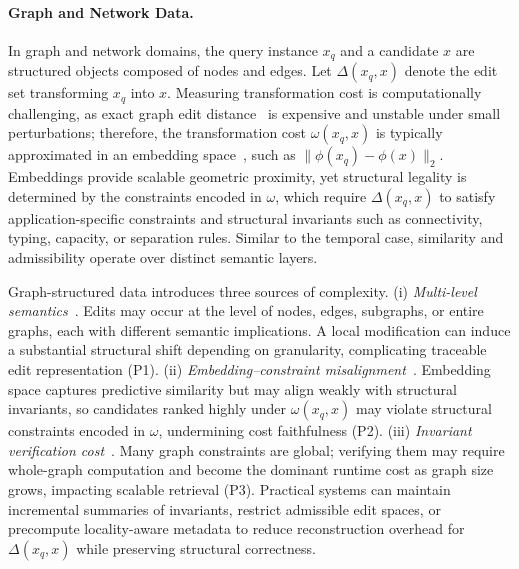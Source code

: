 \paragraph{Graph and Network Data.}

In graph and network domains, the query instance $x_q$ and a candidate $x$ are structured objects composed of nodes and edges. Let $\Delta(x_q,x)$ denote the edit set transforming $x_q$ into $x$. Measuring transformation cost is computationally challenging, as exact graph edit distance~\cite{gao2010survey} is expensive and unstable under small perturbations; therefore, the transformation cost $\omega(x_q,x)$ is typically approximated in an embedding space~\cite{kipf2016semi}, such as $\|\phi(x_q)-\phi(x)\|_2$. Embeddings provide scalable geometric proximity, yet structural legality is determined by the constraints encoded in $\omega$, which require $\Delta(x_q,x)$ to satisfy application-specific constraints and structural invariants such as connectivity, typing, capacity, or separation rules. Similar to the temporal case, similarity and admissibility operate over distinct semantic layers.

Graph-structured data introduces three sources of complexity. (i) \emph{Multi-level semantics}~\cite{liang2021mile}. Edits may occur at the level of nodes, edges, subgraphs, or entire graphs, each with different semantic implications. A local modification can induce a substantial structural shift depending on granularity, complicating traceable edit representation (P1). (ii) \emph{Embedding–constraint misalignment}~\cite{armgaan2024graphtrail}. Embedding space captures predictive similarity but may align weakly with structural invariants, so candidates ranked highly under $\omega(x_q,x)$ may violate structural constraints encoded in $\omega$, undermining cost faithfulness (P2). (iii) \emph{Invariant verification cost}~\cite{xu2018powerful}. Many graph constraints are global; verifying them may require whole-graph computation and become the dominant runtime cost as graph size grows, impacting scalable retrieval (P3). Practical systems can maintain incremental summaries of invariants, restrict admissible edit spaces, or precompute locality-aware metadata to reduce reconstruction overhead for $\Delta(x_q,x)$ while preserving structural correctness.

